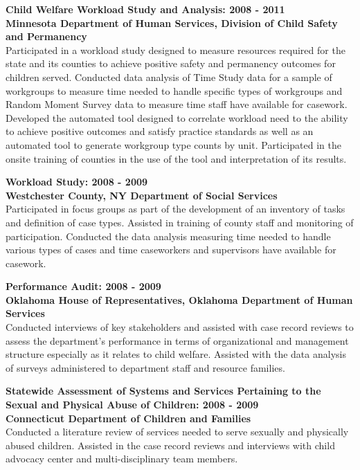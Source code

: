 \documentclass[line, mm, 10pt]{res}
\begin{document}
\begin{resume}
  {\bf Child Welfare Workload Study and Analysis: 2008 - 2011} \\
  {\bf Minnesota Department of Human Services, Division of Child Safety and
    Permanency} \\
  Participated in a workload study designed to measure resources
  required for the state and its counties to achieve positive safety and
  permanency outcomes for children served. Conducted data analysis of
  Time Study data for a sample of workgroups to measure time needed to
  handle specific types of workgroups and Random Moment Survey data to
  measure time staff have available for casework.  Developed the
  automated tool designed to correlate workload need to the ability to
  achieve positive outcomes and satisfy practice standards as well as an
  automated tool to generate workgroup type counts by unit.
  Participated in the onsite training of counties in the use of the tool
  and interpretation of its results.

  {\bf Workload Study: 2008 - 2009} \\
  {\bf Westchester County, NY Department of Social Services} \\
  Participated in focus groups as part of the
  development of an inventory of tasks and definition of case
  types. Assisted in training of county staff and monitoring of
  participation.  Conducted the data analysis measuring time needed to
  handle various types of cases and time caseworkers and supervisors
  have available for casework.

  {\bf Performance Audit: 2008 - 2009} \\
  {\bf Oklahoma House of Representatives, Oklahoma Department of Human
    Services} \\
  Conducted interviews of key stakeholders and assisted with case
  record reviews to assess the department's performance in terms of
  organizational and management structure especially as it relates to
  child welfare.  Assisted with the data analysis of surveys
  administered to department staff and resource families.

  {\bf Statewide Assessment of Systems and Services Pertaining to the
    Sexual and Physical Abuse of Children: 2008 - 2009} \\
  {\bf Connecticut Department of Children and Families} \\
  Conducted a literature review of services needed to serve sexually
  and physically abused children.  Assisted in the case record reviews
  and interviews with child advocacy center and multi-disciplinary
  team members.


\end{resume}
\end{document}
